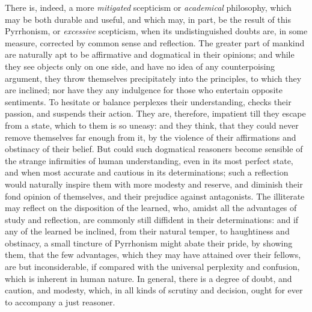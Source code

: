 \documentclass[]{article}
\begin{document}
\begin{sectionbody}

\humeparagraph  There is, indeed, a more \emph{mitigated}  scepticism or \emph{academical} philosophy, which may be both durable and useful, and which may, in part, be the result of this Pyrrhonism, or \emph{excessive} scepticism, when its undistinguished doubts are, in some measure, corrected by common sense and reflection. The greater part of mankind are naturally apt to be affirmative and dogmatical in their opinions; and while they see objects only on one side, and have no idea of any counterpoising argument, they throw themselves precipitately into the principles, to which they are inclined; nor have they any indulgence for those who entertain opposite sentiments. To hesitate or balance perplexes their understanding, checks their passion, and suspends their action. They are, therefore, impatient till they escape from a state, which to them is so uneasy: and they think, that they could never remove themselves far enough from it, by the violence of their affirmations and obstinacy of their belief. But could such dogmatical reasoners become sensible of the strange infirmities of human understanding, even in its most perfect state, and when most accurate and cautious in its determinations; such a reflection would naturally inspire them with more modesty and reserve, and diminish their fond opinion of themselves, and their prejudice against antagonists. The illiterate may reflect on the disposition of the learned, who, amidst all the advantages of study and reflection, are commonly still diffident in their determinations: and if any of the learned be inclined, from their natural temper, to haughtiness and obstinacy, a small tincture of Pyrrhonism might abate their pride, by showing them, that the few advantages, which they may have attained over their fellows, are but inconsiderable, if compared with the universal perplexity and confusion, which is inherent in human nature. In general, there is a degree of doubt, and caution, and modesty, which, in all kinds of scrutiny and decision, ought for ever to accompany a just reasoner.


\end{sectionbody}
\end{document}
